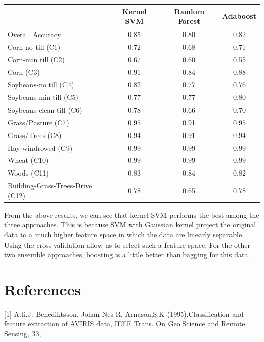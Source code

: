 \documentclass[11pt]{article}
\begin{document}
\begin{center}
\begin{tabular}{|l|c|c|c|}
  \hline
                  & Kernel SVM & Random Forest & Adaboost \\ \hline
  Overall Accuracy & $\mathbf{0.85}$ & 0.80 & 0.82 \\
  Corn-no till (C1) & $\mathbf{0.72}$ & 0.68 & 0.71 \\
  Corn-min till (C2) & $\mathbf{0.67}$ & 0.60 & 0.55 \\
  Corn (C3)          & $\mathbf{0.91}$ & 0.84 & 0.88 \\
  Soybeans-no till (C4) & $\mathbf{0.82}$ & 0.77 & 0.76 \\
  Soybeans-min till (C5) & 0.77 & 0.77 & $\mathbf{0.80}$ \\
  Soybeans-clean till (C6) & $\mathbf{0.78}$ & 0.66 & 0.70 \\
  Grass/Pasture (C7) & $\mathbf{0.95}$ & 0.91 & $\mathbf{0.95}$ \\
  Grass/Trees (C8) & $\mathbf{0.94}$ & 0.91 & $\mathbf{0.94}$ \\
  Hay-windrowed (C9) & $\mathbf{0.99}$ & $\mathbf{0.99}$ & $\mathbf{0.99}$ \\
  Wheat (C10) & $\mathbf{0.99}$ & $\mathbf{0.99}$ & $\mathbf{0.99}$ \\
  Woods (C11) & 0.83 & $\mathbf{0.84}$ & 0.82 \\
  Building-Grass-Trees-Drive (C12) & $\mathbf{0.78}$ & 0.65 & $\mathbf{0.78}$ \\
  \hline
\end{tabular}
\end{center}

From the above results, we can see that kernel SVM performs the best among the three approaches. This is because SVM with Gaussian kernel project the original data to a much higher feature space in which the data are linearly separable. Using the cross-validation allow us to select such a feature space. For the other two ensemble approaches, boosting is a little better than bagging for this data. 


\section*{References}
[1] Atli,J. Benediktsson, Johan Nes R, Arnason,S.K (1995),Classification and feature extraction of AVIRIS data, IEEE Trans. On Geo Science and Remote Sensing, 33,
\end{document}
